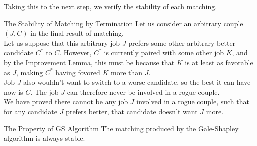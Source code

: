 Taking this to the next step, we verify the stability of each matching.
\begin{ln-think}{The Stability of Matching by Termination}{}
    Let us consider an arbitrary couple $(J, C)$ in the final result of matching. \\
    Let us suppose that this arbitrary job $J$ prefers some other arbitrary better candidate $C^*$ to $C$. However, $C^*$ is currently paired with some other job $K$, and by the Improvement Lemma, this must be because that $K$ is at least as favorable as $J$, making $C^*$ having fovored $K$ more than $J$. \\
    Job $J$ also wouldn't want to switch to a worse candidate, so the best it can have now is $C$. The job $J$ can therefore never be involved in a rogue couple. \\
    We have proved there cannot be any job $J$ involved in a rogue couple, such that for any candidate $J$ prefers better, that candidate doesn't want $J$ more.
    \begin{ln-theorem}{The Property of GS Algorithm}{}
        The matching produced by the Gale-Shapley algorithm is always stable.
    \end{ln-theorem}
\end{ln-think}

